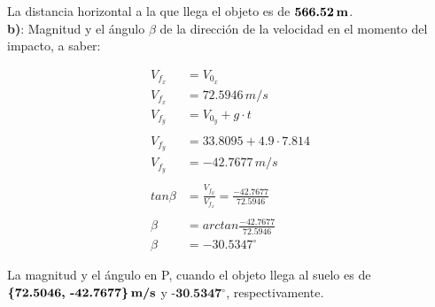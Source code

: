 \documentclass[11pt,letterpaper]{article}
\begin{document}
La distancia horizontal a la que llega el objeto es de $\textbf{566.52\,m}$.\\

\textbf{b)}: Magnitud y el ángulo $\beta$ de la dirección de la velocidad en el momento del impacto, a saber:

\begin{align*}
	V_{f_{x}} &= V_{0_{x}}\\
	V_{f_{x}} &= 72.5946\, m/s\\
	V_{f_{y}} &= V_{0_{y}} + g \cdot t\\
	\,\\
	V_{f_{y}} &= 33.8095 + 4.9 \cdot 7.814\\
	V_{f_{y}} &= -42.7677\,m/s
	\,\\ \,\\
	tan \beta &= \frac {V_{f_{y}}}{V_{f_{x}}} = \frac {-42.7677}{72.5946}\\ \,\\
	\beta &= arctan \frac {-42.7677}{72.5946}\\
	\beta &= -30.5347 ^\circ
\end{align*}

La magnitud y el ángulo en P, cuando el objeto llega al suelo es de $\textbf{\{72.5046, -42.7677\}\,m/s}$ y $\textbf{-30.5347}$$^\circ$, respectivamente.\\

\end{document}
